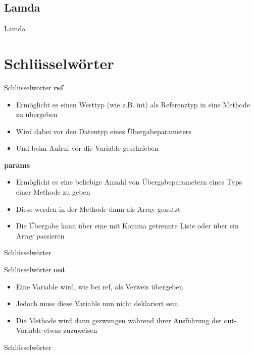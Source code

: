 \subsection{Lamda}
\begin{frame}{Lamda}

\end{frame}

\section{Schlüsselwörter}
\begin{frame}{Schlüsselwörter}
	\textbf{ref}\\
	\begin{itemize}
		\item Ermöglicht es einen Werttyp (wie z.B. int) als Referenztyp in eine Methode zu übergeben
		\item Wird dabei vor den Datentyp eines Übergabeparameters
		\item Und beim Aufruf vor die Variable geschrieben
	\end{itemize}
	\textbf{params}\\
	\begin{itemize}
		\item Ermöglicht es eine beliebige Anzahl von Übergabeparametern eines Typs einer Methode zu geben
		\item Diese werden in der Methode dann als Array genutzt
		\item Die Übergabe kann über eine mit Komma getrennte Liste oder über ein Array passieren
	\end{itemize}
\end{frame}

\begin{frame}{Schlüsselwörter}
	
	
\end{frame}

\begin{frame}{Schlüsselwörter}
	\textbf{out}\\
	\begin{itemize}
		\item Eine Variable wird, wie bei \alert{ref}, als Verweis übergeben
		\item Jedoch muss diese Variable nun nicht deklariert sein
		\item Die Methode wird dann gezwungen während ihrer Ausführung der \alert{out}-Variable etwas zuzuweisen
	\end{itemize}
\end{frame}

\begin{frame}{Schlüsselwörter}
	
	
\end{frame}



